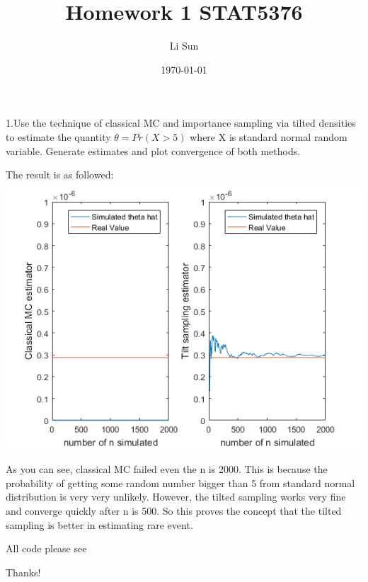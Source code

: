 \documentclass[11pt]{article}
\begin{document}
\title{Homework 1 STAT5376}
\author{Li Sun}
\date{\today}
\maketitle

\noindent
1.Use the technique of classical MC and importance sampling via tilted densities to estimate the quantity $\theta=Pr(X>5)$ where X is standard normal random variable. Generate estimates and plot convergence of both methods.

The result is as followed:\\
\includegraphics[scale=1]{hw1p1.png}

\bigskip
As you can see, classical MC failed even the n is 2000. This is because the probability of getting some random number bigger than 5 from standard normal distribution is very very unlikely. However, the tilted sampling works very fine and converge quickly after n is 500. So this proves the concept that the tilted sampling is better in estimating rare event.

All code please see \\
\bigskip

Thanks!
\end{document}
